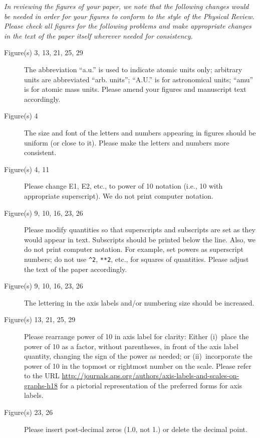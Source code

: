 \documentclass[aps
,prstab
,preprint,tightenlines
,amsfonts,amssymb,amsmath
]{revtex4-1}
\begin{document}
{\em In reviewing the figures of your paper, we note that the
  following changes would be needed in order for your figures to
  conform to the style of the Physical Review.  Please check all
  figures for the following problems and make appropriate changes in
  the text of the paper itself wherever needed for consistency.

\begin{description}
  
\item[Figure(s) 3, 13, 21, 25, 29] The abbreviation ``a.u.'' is used
  to indicate atomic units only; arbitrary units are abbreviated
  ``arb.  units''; ``A.U.'' is for astronomical units; ``amu'' is for
  atomic mass units.  Please amend your figures and manuscript text
  accordingly.
  
\item[Figure(s) 4] The size and font of the letters and numbers
  appearing in figures should be uniform (or close to it).  Please
  make the letters and numbers more consistent.

\item[Figure(s) 4, 11] Please change E1, E2, etc., to power of 10
  notation (i.e., 10 with appropriate superscript).  We do not print
  computer notation.

\item[Figure(s) 9, 10, 16, 23, 26] Please modify quantities so that
  superscripts and subscripts are set as they would appear in
  text. Subscripts should be printed below the line. Also, we do not
  print computer notation. For example, set powers as superscript
  numbers; do not use \verb!^2!, \verb!**2!, etc., for squares of
  quantities. Please adjust the text of the paper accordingly.
  
\item[Figure(s) 9, 10, 16, 23, 26] The lettering in the axis labels
  and/or numbering size should be increased.
  
\item[Figure(s) 13, 21, 25, 29] Please rearrange power of 10 in axis
  label for clarity: Either (i)~place the power of 10 as a factor,
  without parentheses, in front of the axis label quantity, changing
  the sign of the power as needed; or (ii)~incorporate the power of 10
  in the topmost or rightmost number on the scale.  Please refer to
  the URL
  \url{http://journals.aps.org/authors/axis-labels-and-scales-on-graphs-h18}
  for a pictorial representation of the preferred forms for axis
  labels.
  
\item[Figure(s) 23, 26] Please insert post-decimal zeros (1.0, not 1.)
  or delete the decimal point.

\end{description}
}
\end{document}
